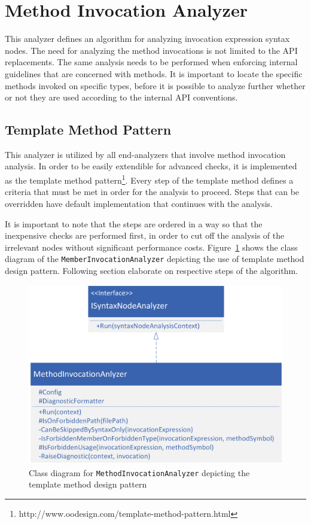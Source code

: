 \documentclass[
  digital, %
  table,   %
  lof,     %
  lot,     %
  oneside,
]{fithesis3}
\begin{document}
\section{Method Invocation Analyzer}
This analyzer defines an algorithm for analyzing invocation expression syntax nodes. The need for analyzing the method invocations is not limited to the API replacements. The same analysis needs to be performed when enforcing internal guidelines that are concerned with methods. It is important to locate the specific methods invoked on specific types, before it is possible to analyze further whether or not they are used according to the internal API conventions. 

\subsection{Template Method Pattern}
This analyzer is utilized by all end-analyzers that involve method invocation analysis. In order to be easily extendible for advanced checks, it is implemented as the template method pattern\footnote{http://www.oodesign.com/template-method-pattern.html}. Every step of the template method defines a criteria that must be met in order for the analysis to proceed. Steps that can be overridden have default implementation that continues with the analysis. 

It is important to note that the steps are ordered in a way so that the inexpensive checks are performed first, in order to cut off the analysis of the irrelevant nodes without significant performance costs. Figure~\ref{fig:uml-method-invocation-analyzer} shows the class diagram of the \texttt{MemberInvocationAnalyzer} depicting the use of template method design pattern. Following section elaborate on respective steps of the algorithm.

\begin{figure}[h!]
		\centering
			\includegraphics[scale=0.75]{img/uml/method-invocation-analyzer}
		\caption{Class diagram for \texttt{MethodInvocationAnalyzer} depicting the template method design pattern}
		\label{fig:uml-method-invocation-analyzer}
\end{figure}
\end{document}
